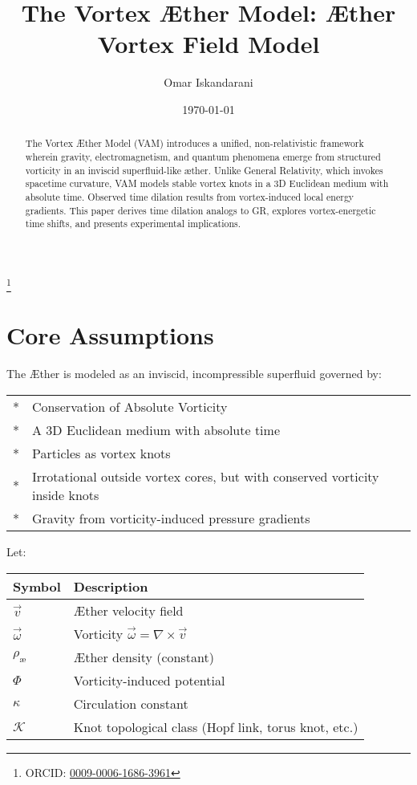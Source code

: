 \documentclass[aps,preprint,superscriptaddress]{revtex4}
\begin{document}
\sloppy %
\author{Omar Iskandarani}
\title{The Vortex Æther Model: Æther Vortex Field Model}
\date{\today}
\thanks{ORCID: \href{https://orcid.org/0009-0006-1686-3961}{0009-0006-1686-3961}}




\begin{abstract}
    The Vortex Æther Model (VAM) introduces a unified, non-relativistic framework wherein gravity, electromagnetism, and quantum phenomena emerge from structured vorticity in an inviscid superfluid-like æther. Unlike General Relativity, which invokes spacetime curvature, VAM models stable vortex knots in a 3D Euclidean medium with absolute time. Observed time dilation results from vortex-induced local energy gradients. This paper derives time dilation analogs to GR, explores vortex-energetic time shifts, and presents experimental implications.
\end{abstract}


\maketitle
    \section*{Core Assumptions}
    The Æther is modeled as an inviscid, incompressible superfluid governed by:

\begin{tabular}{ll}
    \toprule
    \midrule
        * & Conservation of Absolute Vorticity \\
        * & A 3D Euclidean medium with absolute time \\
        * & Particles as vortex knots \\
        * & Irrotational outside vortex cores, but with conserved vorticity inside knots \\
        * & Gravity from vorticity-induced pressure gradients \\
    \bottomrule
\end{tabular}

    Let:

    \begin{tabular}{ll}
        \toprule
        Symbol & Description \\
        \midrule
        \(\vec{v}\) & Æther velocity field \\
        \(\vec{\omega}\) &  Vorticity \(\vec{\omega} = \nabla \times \vec{v}\) \\
        \(\rho_\text{æ}\) & Æther density (constant) \\
        \(\Phi\) & Vorticity-induced potential \\
        \(\kappa\) & Circulation constant \\
        \(\mathcal{K}\) & Knot topological class (Hopf link, torus knot, etc.) \\
        \bottomrule
    \end{tabular}
\end{document}
